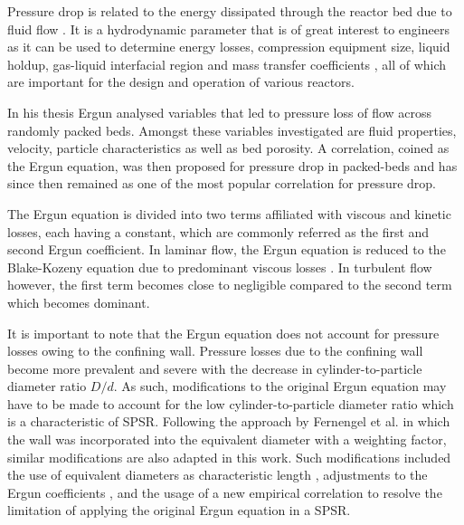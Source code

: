 Pressure drop is related to the energy dissipated through the reactor bed due to fluid flow \cite{Al-Dahhan1994}. It is a hydrodynamic parameter that is of great interest to engineers as it can be used to determine energy losses, compression equipment size, liquid holdup, gas-liquid interfacial region and mass transfer coefficients \cite{Al-Dahhan1995a,Wammes1991,Holub1992}, all of which are important for the design and operation of various reactors.


In his thesis Ergun \cite{Ergun1952} analysed variables that led to pressure loss of flow across randomly packed beds. Amongst these variables investigated are fluid properties, velocity, particle characteristics as well as bed porosity. A correlation, coined as the Ergun equation, was then proposed for pressure drop in packed-beds and has since then remained as one of the most popular correlation for pressure drop.

The Ergun equation is divided into two terms affiliated with viscous and kinetic losses, each having a constant, which are commonly referred as the first and second Ergun coefficient. In laminar flow, the Ergun equation is reduced to the Blake-Kozeny equation due to predominant viscous losses \cite{Blake1922,Kozeny1927a}. In turbulent flow however, the first term becomes close to negligible compared to the second term which becomes dominant.

It is important to note that the Ergun equation does not account for pressure losses owing to the confining wall. Pressure losses due to the confining wall become more prevalent and severe with the decrease in cylinder-to-particle diameter ratio $D/d$. As such, modifications to the original Ergun equation may have to be made to account for the low cylinder-to-particle diameter ratio which is a characteristic of SPSR. Following the approach by Fernengel et al. \cite{Fernengel2020} in which the wall was incorporated into the equivalent diameter with a weighting factor, similar modifications are also adapted in this work. Such modifications included the use of equivalent diameters as characteristic length \cite{Scott1974,Mehta1969}, adjustments to the Ergun coefficients \cite{Reichelt1972, Eisfeld2001, Fand1993}, and the usage of a new empirical correlation \cite{Guo2017} to resolve the limitation of applying the original Ergun equation in a SPSR.

